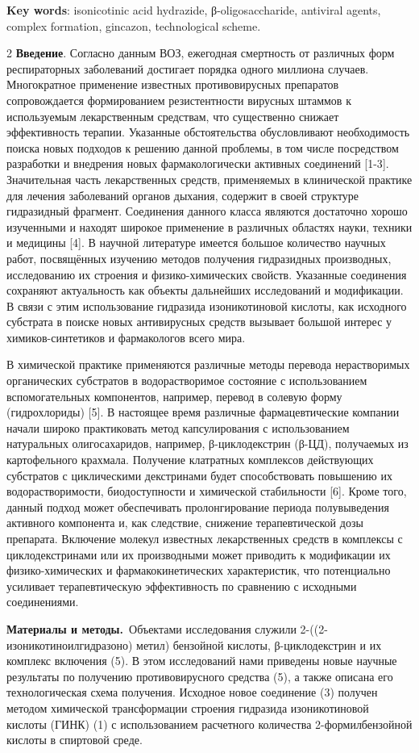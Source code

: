 {\bfseries Key words}: isonicotinic acid hydrazide, β-oligosaccharide,
antiviral agents, complex formation, ginca\-zon, technological scheme.

\begin{multicols}{2}
{\bfseries Введение}. Согласно данным ВОЗ, ежегодная смертность от
различных форм респираторных заболеваний достигает порядка одного
миллиона случаев. Многократное применение известных противовирусных
препаратов сопровождается формированием резистентности вирусных штаммов
к используемым лекарственным средствам, что существенно снижает
эффективность терапии. Указанные обстоятельства обусловливают
необходимость поиска новых подходов к решению данной проблемы, в том
числе посредством разработки и внедрения новых фармакологически активных
соединений {[}1-3{]}. Значительная часть лекарственных средств,
применяемых в клинической практике для лечения заболеваний органов
дыхания, содержит в своей структуре гидразидный фрагмент. Соединения
данного класса являются достаточно хорошо изученными и находят широкое
применение в различных областях науки, техники и медицины {[}4{]}. В
научной литературе имеется большое количество научных работ, посвящённых
изучению методов получения гидразидных производных, исследованию их
строения и физико-химических свойств. Указанные соединения сохраняют
актуальность как объекты дальнейших исследований и модификации. В связи
с этим использование гидразида изоникотиновой кислоты, как исходного
субстрата в поиске новых антивирусных средств вызывает большой интерес у
химиков-синтетиков и фармакологов всего мира.

В химической практике применяются различные методы перевода
нерастворимых органических субстратов в водорастворимое состояние с
использованием вспомогательных компонентов, например, перевод в солевую
форму (гидрохлориды) {[}5{]}. В настоящее время различные
фармацевтические компании начали широко практиковать метод
капсулирования с использованием натуральных олигосахаридов, например,
β-циклодекстрин (β-ЦД), получаемых из картофельного крахмала. Получение
клатратных комплексов действующих субстратов с циклическими декстринами
будет способствовать повышению их водорастворимости, биодоступности и
химической стабильности {[}6{]}. Кроме того, данный подход может
обеспечивать пролонгирование периода полувыведения активного компонента
и, как следствие, снижение терапевтической дозы препарата. Включение
молекул известных лекарственных средств в комплексы с циклодекстринами
или их производными может приводить к модификации их физико-химических и
фармакокинетических характеристик, что потенциально усиливает
терапевтическую эффективность по сравнению с исходными соединениями.

{\bfseries Материалы и методы.}~Объектами исследования служили
2-((2-изоникотиноилгидразоно) метил) бензойной кислоты, β-циклодекстрин
и их комплекс включения (5). В этом исследований нами приведены новые
научные результаты по получению противовирусного средства (5), а также
описана его технологическая схема получения. Исходное новое соединение
(3) получен методом химической трансформации строения гидразида
изоникотиновой кислоты (ГИНК) (1) с использованием расчетного количества
2-формилбензойной кислоты в спиртовой среде.
\end{multicols}

